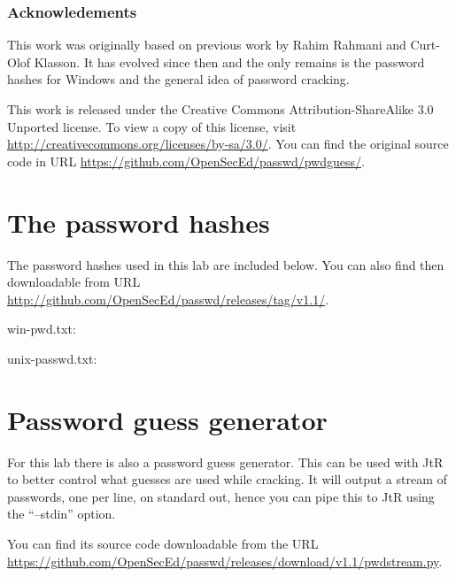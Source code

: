 \subsubsection*{Acknowledements}

This work was originally based on previous work by Rahim Rahmani and Curt-Olof 
Klasson.
It has evolved since then and the only remains is the password hashes for 
Windows and the general idea of password cracking.

This work is released under the Creative Commons Attribution-ShareAlike 3.0 
Unported license.
To view a copy of this license, visit 
\url{http://creativecommons.org/licenses/by-sa/3.0/}.
You can find the original source code in URL 
\url{https://github.com/OpenSecEd/passwd/pwdguess/}.


\appendix
\section{The password hashes}%
\label{sec:hashes}

The password hashes used in this lab are included below.
You can also find then downloadable from URL
\url{http://github.com/OpenSecEd/passwd/releases/tag/v1.1/}.

win-pwd.txt:


unix-passwd.txt:



\section{Password guess generator}%
\label{sec:pwdstream}

For this lab there is also a password guess generator.
This can be used with \ac{JtR} to better control what guesses are used while 
cracking.
It will output a stream of passwords, one per line, on standard out, hence you 
can pipe this to \ac{JtR} using the \enquote{--stdin} option.

You can find its source code downloadable from the URL
\url{https://github.com/OpenSecEd/passwd/releases/download/v1.1/pwdstream.py}.

%


\printbibliography{}
